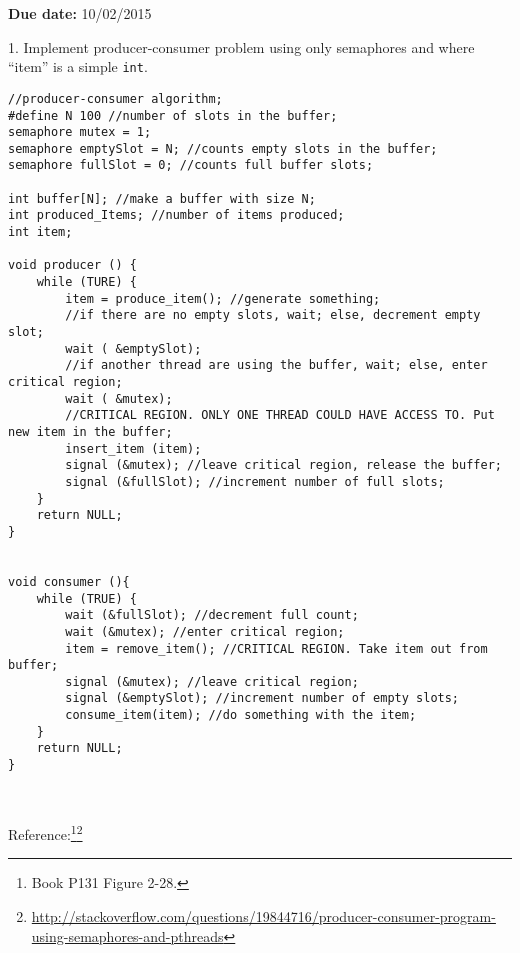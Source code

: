 \documentclass[12pt]{article}
\begin{document}
\textbf{Due date:}{ 10/02/2015}\hfill \break
\newline

1. Implement producer-consumer problem using only semaphores and where \enquote{item} is a simple \texttt{int}.\hfill 
\begin{lstlisting}
//producer-consumer algorithm;
#define N 100 //number of slots in the buffer;
semaphore mutex = 1; 
semaphore emptySlot = N; //counts empty slots in the buffer;
semaphore fullSlot = 0; //counts full buffer slots;

int buffer[N]; //make a buffer with size N;
int produced_Items; //number of items produced;
int item;

void producer () {
	while (TURE) {
		item = produce_item(); //generate something;
		//if there are no empty slots, wait; else, decrement empty slot;
		wait ( &emptySlot); 
		//if another thread are using the buffer, wait; else, enter critical region;
		wait ( &mutex);
		//CRITICAL REGION. ONLY ONE THREAD COULD HAVE ACCESS TO. Put new item in the buffer;
		insert_item (item);
		signal (&mutex); //leave critical region, release the buffer;
		signal (&fullSlot); //increment number of full slots;
	}
	return NULL;
}


void consumer (){
	while (TRUE) {
		wait (&fullSlot); //decrement full count;
		wait (&mutex); //enter critical region;
		item = remove_item(); //CRITICAL REGION. Take item out from buffer;
		signal (&mutex); //leave critical region;
		signal (&emptySlot); //increment number of empty slots;
		consume_item(item); //do something with the item;
	}
	return NULL;
}



\end{lstlisting}
Reference:\footnote{Book P131 Figure 2-28.}\footnote{\url{http://stackoverflow.com/questions/19844716/producer-consumer-program-using-semaphores-and-pthreads}}\hfill 
\clearpage 
\end{document}

